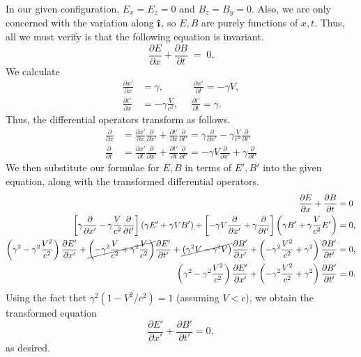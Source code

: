 \documentclass[10pt]{article}
\newcommand{\uveci}{{\bm{\hat{\textnormal{\bfseries\i}}}}}
\newcommand\pp[2]{\frac{\partial #1}{\partial #2}}
\begin{document}
        In our given configuration, $E_x = E_z = 0$ and $B_z = B_y = 0$. Also, we are only concerned with the variation along $\uveci$,
        so $E, B$ are purely functions of $x, t$. Thus, all we must verify is that the following equation is invariant.
        \[
                \pp{E}{x} + \pp{B}{t} \;=\; 0.
        \]
        We calculate
        \begin{align*}
                \pp{x'}{x} &= \gamma, \quad\quad\quad \pp{x'}{t} = -\gamma V, \\
                \pp{t'}{x} &= -\gamma\frac{V}{c^2}, \quad\; \pp{t'}{t} = \gamma.
        \end{align*}
        Thus, the differential operators transform as follows.
        \begin{align*}
                \pp{}{x} &= \pp{x'}{x}\pp{}{x'} + \pp{t'}{x}\pp{}{t'}
                        = \gamma\pp{}{x'} - \gamma\frac{V}{c^2}\pp{}{t'} \\
                \pp{}{t} &= \pp{x'}{t}\pp{}{x'} + \pp{t'}{t}\pp{}{t'}
                        = -\gamma V\pp{}{x'} + \gamma\pp{}{t'} 
        \end{align*}
        We then substitute our formulae for $E, B$ in terms of $E', B'$ into the given equation, along with the transformed differential operators.
        \begin{align*}
                \pp{E}{x} + \pp{B}{t} &= 0 \\
                \left[\gamma\pp{}{x'} - \gamma\frac{V}{c^2}\pp{}{t'}\right](\gamma E' + \gamma VB') +
                        \left[-\gamma V\pp{}{x'} + \gamma\pp{}{t'}\right]\left(\gamma B' + \gamma\frac{V}{c^2}E'\right) &= 0, \\
                \left(\gamma^2 - \gamma^2\frac{V^2}{c^2}\right)\pp{E'}{x'} +
                        \cancel{\left(-\gamma^2\frac{V}{c^2} + \gamma^2\frac{V}{c^2}\right)}\pp{E'}{t'} +
                        \cancel{\left(\gamma^2V - \gamma^2V\right)}\pp{B'}{x'} + \left(-\gamma^2\frac{V^2}{c^2} +
                        \gamma^2\right)\pp{B'}{t'} &= 0,\\
                \left(\gamma^2 - \gamma^2\frac{V^2}{c^2}\right)\pp{E'}{x'} + \left(-\gamma^2\frac{V^2}{c^2} + \gamma^2\right)\pp{B'}{t'} &= 0.
        \end{align*}
        Using the fact thet $\gamma^2(1 - V^2 /c^2) = 1$ (assuming $V < c$), we obtain the transformed equation
        \[
                \pp{E'}{x'} + \pp{B'}{t'} = 0,
        \]
        as desired.
\end{document}
